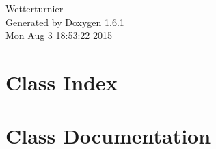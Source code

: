 \documentclass[a4paper]{article}
\begin{document}
\hypersetup{pageanchor=false}
\begin{titlepage}
\vspace*{7cm}
\begin{center}
{\Large Wetterturnier }\\
\vspace*{1cm}
{\large Generated by Doxygen 1.6.1}\\
\vspace*{0.5cm}
{\small Mon Aug 3 18:53:22 2015}\\
\end{center}
\end{titlepage}
\tableofcontents
{}
\hypersetup{pageanchor=true}
\section{Class Index}

\section{Class Documentation}







\printindex
\end{document}
